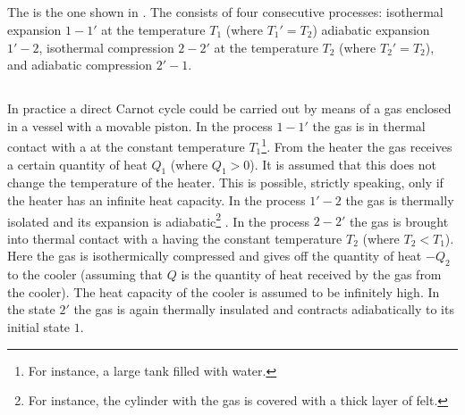 \subsection{}\label{11.1.6} The  is the one shown in . The  consists of four consecutive processes: isother­mal expansion $1-1'$ at the temperature $T_{1}$ (where $T_{1}' = T_{2}$) adiabatic expansion $1'-2$, isothermal compression $2-2'$ at the temperature $T_{2}$ (where $T_{2}' = T_{2}$), and adiabatic compres­sion $2'-1$.

\subsection{}\label{11.1.7} In practice a direct Carnot cycle could be carried out by means of a gas enclosed in a vessel with a movable piston. In the process $1-1'$ the gas is in thermal contact with a  at the constant temperature $T_{1}$\footnote{For instance, a large tank filled with water.}. From the heater the gas receives a certain quantity of heat $Q_{1}$ (where $Q_{1} > 0$). It is assumed that this does not change the temperature of the heater. This is possible, strictly speaking, only if the heater has an infinite heat capacity. In the process $1'-2$ the gas is thermally isolated and its expansion is adiabatic\footnote{ For instance, the cylinder with the gas is covered with a thick layer of felt.} . In the process $2-2'$ the gas is brought into thermal contact with a  having the constant temperature $T_{2}$ (where $T_{2} < T_{1}$). Here the gas is isothermically compressed and gives off the quantity of heat $-Q_{2}$ to the cooler (assuming that $Q$ is the quantity of heat received by the gas from the cooler). The heat capacity of the cooler is assumed to be infinitely high. In the state $2'$ the gas is again thermally insulated and contracts adiabatically to its initial state $1$.

